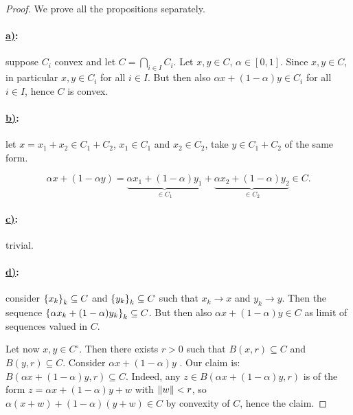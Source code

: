 \begin{proof}
    
    We prove all the propositions separately.

    \paragraph{\underline{a)}:} suppose $C_i$ convex and let $C = \displaystyle\bigcap_{i \in I} C_i$. Let $x,y \in C$, $\alpha \in [0,1]$. Since $x,y \in C$, in particular $x,y \in C_i$ for all $i \in I$. But then also $\alpha x + (1-\alpha)y \in C_i$ for all $i \in I$, hence $C$ is convex.

    \paragraph{\underline{b)}:} let $x = x_1 + x_2 \in C_1 + C_2$, $x_1 \in C_1$ and $x_2 \in C_2$, take $y \in C_1 + C_2$ of the same form. 
    
    \[ \alpha x + (1-\alpha y) = \underbrace{\alpha x_1 + (1-\alpha)y_1}_{\in C_1} + \underbrace{\alpha x_2 + (1-\alpha)y_2}_{\in C_2} \in C. \]

    \paragraph{\underline{c)}:} trivial.

    \paragraph{\underline{d)}:} consider $\left\{ x_k \right\}_k \subseteq C$ and $\left\{ y_k \right\}_k \subseteq C$ such that $x_k \to x$ and $y_k \to y$. Then the sequence $\left\{ \alpha x_k + (1-\alpha)y_k \right\}_k \subseteq C$. But then also $\alpha x + (1-\alpha)y \in C$ as limit of sequences valued in $C$. 

    Let now $x,y \in C^\circ$. Then there exists $r > 0$ such that $B(x,r) \subseteq C$ and $B(y,r) \subseteq C$. Consider $\alpha x + (1-\alpha)y$ . Our claim is: $B(\alpha x + (1-\alpha)y, r) \subseteq C$. Indeed, any $z \in B(\alpha x + (1-\alpha)y,r)$ is of the form $z = \alpha x + (1-\alpha)y + w$ with $\lVert w \rVert < r$, so $\alpha (x+w) + (1-\alpha)(y+w) \in C$ by convexity of $C$, hence the claim.

\end{proof}

